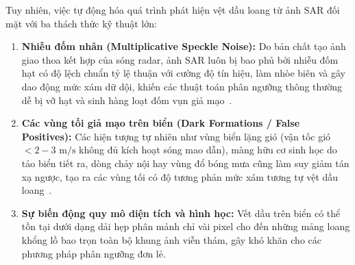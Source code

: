 Tuy nhiên, việc tự động hóa quá trình phát hiện vệt dầu loang từ ảnh SAR đối mặt với ba thách thức kỹ thuật lớn:
\begin{enumerate}
    \item \textbf{Nhiễu đốm nhân (Multiplicative Speckle Noise):} Do bản chất tạo ảnh giao thoa kết hợp của sóng radar, ảnh SAR luôn bị bao phủ bởi nhiễu đốm hạt có độ lệch chuẩn tỷ lệ thuận với cường độ tín hiệu, làm nhòe biên và gây dao động mức xám dữ dội, khiến các thuật toán phân ngưỡng thông thường dễ bị vỡ hạt và sinh hàng loạt đốm vụn giả mạo~\cite{lee1980digital}.
    \item \textbf{Các vùng tối giả mạo trên biển (Dark Formations / False Positives):} Các hiện tượng tự nhiên như vùng biển lặng gió (vận tốc gió $< 2-3\text{ m/s}$ không đủ kích hoạt sóng mao dẫn), màng hữu cơ sinh học do tảo biển tiết ra, dòng chảy nội hay vùng đổ bóng mưa cũng làm suy giảm tán xạ ngược, tạo ra các vùng tối có độ tương phản mức xám tương tự vệt dầu loang~\cite{brekke2005oil,solberg2007oil}.
    \item \textbf{Sự biến động quy mô diện tích và hình học:} Vết dầu trên biển có thể tồn tại dưới dạng dải hẹp phân mảnh chỉ vài pixel cho đến những mảng loang khổng lồ bao trọn toàn bộ khung ảnh viễn thám, gây khó khăn cho các phương pháp phân ngưỡng đơn lẻ.
\end{enumerate}

